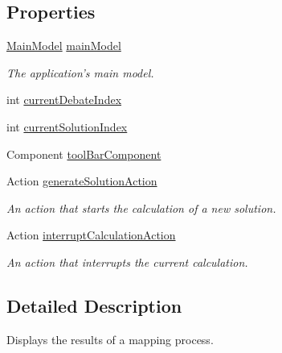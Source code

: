 \subsection*{Properties}
\begin{DoxyCompactItemize}
\item 
\hypertarget{classResultPage_af42f22505361295fea95be9c24c2581b}{\hyperlink{classMainModel}{Main\-Model} \hyperlink{classResultPage_af42f22505361295fea95be9c24c2581b}{main\-Model}}\label{classResultPage_af42f22505361295fea95be9c24c2581b}

\begin{DoxyCompactList}\small\item\em The application's main model. \end{DoxyCompactList}\item 
int \hyperlink{classResultPage_ac6459fe5c02bd49ed488b428a1d9d766}{current\-Debate\-Index}
\item 
int \hyperlink{classResultPage_acfea637505034129528d4e4dcda06041}{current\-Solution\-Index}
\item 
Component \hyperlink{classResultPage_a4634d6af41a1cbf3f566b8dfa63ac67b}{tool\-Bar\-Component}
\item 
\hypertarget{classResultPage_a45726fea9e6169f39f19f5fe57edf614}{Action \hyperlink{classResultPage_a45726fea9e6169f39f19f5fe57edf614}{generate\-Solution\-Action}}\label{classResultPage_a45726fea9e6169f39f19f5fe57edf614}

\begin{DoxyCompactList}\small\item\em An action that starts the calculation of a new solution. \end{DoxyCompactList}\item 
\hypertarget{classResultPage_a48820af67f5ee61a4f2cd51040df269b}{Action \hyperlink{classResultPage_a48820af67f5ee61a4f2cd51040df269b}{interrupt\-Calculation\-Action}}\label{classResultPage_a48820af67f5ee61a4f2cd51040df269b}

\begin{DoxyCompactList}\small\item\em An action that interrupts the current calculation. \end{DoxyCompactList}\end{DoxyCompactItemize}


\subsection{Detailed Description}
Displays the results of a mapping process.

